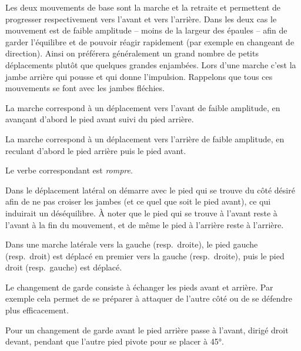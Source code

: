 Les deux mouvements de base sont la marche et la retraite et permettent de progresser respectivement vers l'avant et vers l'arrière.
Dans les deux cas le mouvement est de faible amplitude -- moins de la largeur des épaules -- afin de garder l'équilibre et de pouvoir réagir rapidement (par exemple en changeant de direction).
Ainsi on préférera généralement un grand nombre de petits déplacements plutôt que quelques grandes enjambées.
Lors d'une marche c'est la jambe arrière qui pousse et qui donne l'impulsion.
Rappelons que tous ces mouvements se font avec les jambes fléchies.


\begin{definition}[Marche]

La marche correspond à un déplacement vers l'avant de faible amplitude, en avançant d'abord le pied avant suivi du pied arrière.
\end{definition}


\begin{definition}[Retraite]

La marche correspond à un déplacement vers l'arrière de faible amplitude, en reculant d'abord le pied arrière puis le pied avant.

Le verbe correspondant est \emph{rompre}.
\end{definition}


Dans le déplacement latéral on démarre avec le pied qui se trouve du côté désiré afin de ne pas croiser les jambes (et ce quel que soit le pied avant), ce qui induirait un déséquilibre.
À noter que le pied qui se trouve à l'avant reste à l'avant à la fin du mouvement, et de même le pied à l'arrière reste à l'arrière.

\begin{definition}

Dans une marche latérale vers la gauche (resp.\ droite), le pied gauche (resp.\ droit) est déplacé en premier vers la gauche (resp.\ droite), puis le pied droit (resp.\ gauche) est déplacé.
\end{definition}


Le changement de garde consiste à échanger les pieds avant et arrière.
Par exemple cela permet de se préparer à attaquer de l'autre côté ou de se défendre plus efficacement.


\begin{definition}
\label{dep:def:changement-garde-avant}

Pour un changement de garde avant le pied arrière passe à l'avant, dirigé droit devant, pendant que l'autre pied pivote pour se placer à 45°.
\end{definition}


